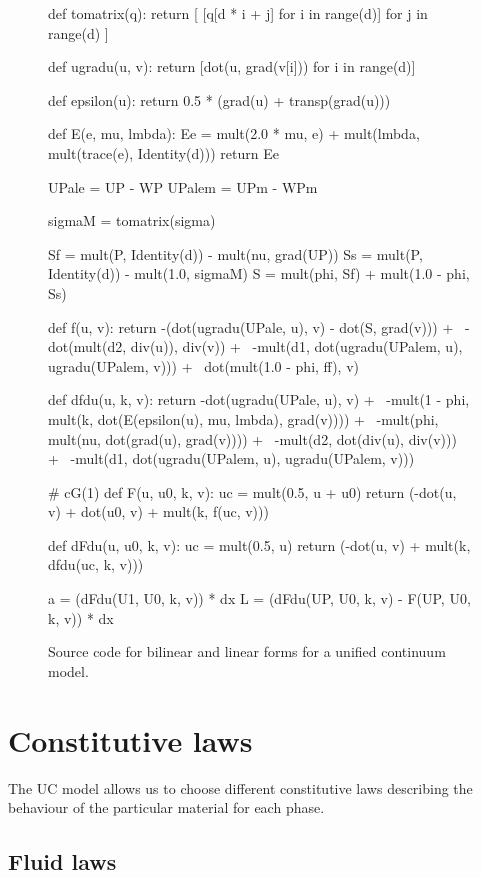 \begin{figure}[h]
  \begin{python}
def tomatrix(q):
    return [ [q[d * i + j] for i in range(d)] for j in range(d) ]

def ugradu(u, v):
    return [dot(u, grad(v[i])) for i in range(d)]

def epsilon(u):
    return 0.5 * (grad(u) + transp(grad(u)))

def E(e, mu, lmbda):
    Ee = mult(2.0 * mu, e) + mult(lmbda, mult(trace(e), Identity(d)))
    return Ee

UPale = UP - WP
UPalem = UPm - WPm

sigmaM = tomatrix(sigma)

Sf = mult(P, Identity(d)) - mult(nu, grad(UP))
Ss = mult(P, Identity(d)) - mult(1.0, sigmaM)
S = mult(phi, Sf) + mult(1.0 - phi, Ss)

def f(u, v):
    return -(dot(ugradu(UPale, u), v) - dot(S, grad(v))) + \
        -dot(mult(d2, div(u)), div(v)) + \
        -mult(d1, dot(ugradu(UPalem, u), ugradu(UPalem, v))) + \
        dot(mult(1.0 - phi, ff), v)

def dfdu(u, k, v):
    return -dot(ugradu(UPale, u), v) + \
        -mult(1 - phi, mult(k, dot(E(epsilon(u), mu, lmbda), grad(v)))) + \
        -mult(phi, mult(nu, dot(grad(u), grad(v)))) + \
        -mult(d2, dot(div(u), div(v))) + \
        -mult(d1, dot(ugradu(UPalem, u), ugradu(UPalem, v)))

# cG(1)
def F(u, u0, k, v):
    uc = mult(0.5, u + u0)
    return (-dot(u, v) + dot(u0, v) + mult(k, f(uc, v)))

def dFdu(u, u0, k, v):
    uc = mult(0.5, u)
    return (-dot(u, v) + mult(k, dfdu(uc, k, v)))

a = (dFdu(U1, U0, k, v)) * dx
L = (dFdu(UP, U0, k, v) - F(UP, U0, k, v)) * dx
\end{python}
\caption{Source code for bilinear and linear forms for a unified continuum model.}
\label{code:UC}
\end{figure}

\section{Constitutive laws}

The UC model allows us to choose different constitutive laws
describing the behaviour of the particular material for each phase.

\subsection{Fluid laws}

